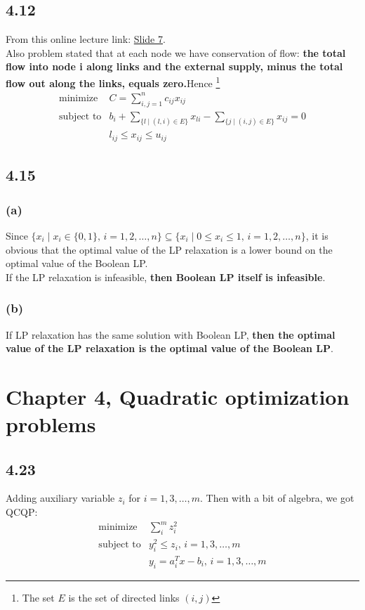 \documentclass{article}
\begin{document}
          \subsection*{4.12}
          From this online lecture link: \href{http://www.ifp.illinois.edu/~angelia/ge330fall09_maxflowl20.pdf}{Slide 7}.\\
Also problem stated that at each node we have conservation of flow: {\bf the total flow into node i along links
and the external supply, minus the total flow out along the links, equals zero.}Hence \footnote{The set $E$ is the set of directed links $(i, j)$}
          \[  \boxed{  \begin{array}{ll}
    \mbox{minimize}   & C = \sum_{i,j = 1}^{n}c_{ij}x_{ij}\\
    \mbox{subject to} & b_i  + \sum_{\{l \mid (l,i) \in E\}}x_{li} - \sum_{\{j \mid (i,j) \in E\}}x_{ij}  = 0\\
  & l_{ij} \le x_{ij} \le u_{ij}
        \end{array} }
  \]    
       \subsection*{ 4.15 } 
           \subsubsection*{(a)}
           Since $ \{x_i \mid x_i \in \{0,1\}, \, i = 1,2,\dots, n\} \subseteq  \{x_i \mid 0 \le x_i \le 1, \, i = 1,2,\dots, n\}$, it is obvious that the optimal value of the LP relaxation is a lower bound on the optimal value of the Boolean LP.\\
           If the LP relaxation is infeasible, { \bf then Boolean LP itself is infeasible}.
    \subsubsection*{(b)}
If LP relaxation has the same solution with  Boolean LP, { \bf then the optimal value of the LP relaxation is the optimal value of the Boolean LP}.
   \section*{Chapter 4, Quadratic optimization problems}	
 \subsection*{4.23}
Adding auxiliary variable $z_i$ for $i = 1, 3, \dots, m$. Then with a bit of algebra, we got QCQP:
       \[  \boxed{  \begin{array}{ll}
    \mbox{minimize}   & \sum_{i}^{m}z_i^2 \\
    \mbox{subject to} & y_i^2 \le z_i,  \, i = 1, 3, \dots, m  \\
    & y_i  = a_i^Tx - b_i,  \, i = 1, 3, \dots, m 
            \end{array} }
            \]
\end{document}

